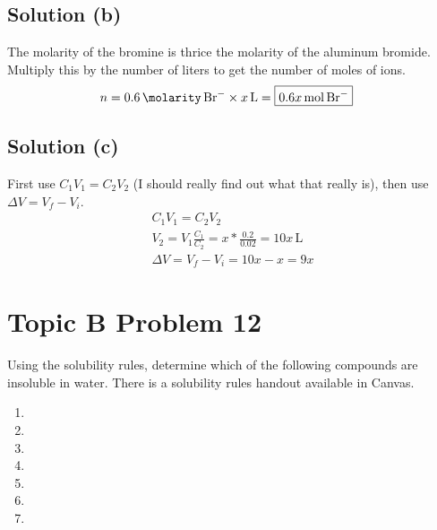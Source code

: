 \documentclass[10pt]{article}
\begin{document}
        \subsection{Solution (b)}
            The molarity of the bromine is thrice the molarity of the aluminum bromide.
            Multiply this by the number of liters to get the number of moles of ions.
            \begin{align}
                n   &=  0.6\,\unit{\molarity}\,\ce{Br-} \times x\,\unit{\liter}
                    =   \boxed{0.6x\,\unit{\mole}\,\ce{Br-}}
            \end{align}
        
        \subsection{Solution (c)}
            First use $C_1 V_1 = C_2 V_2$ (I should really find out what that really is), then use $\Delta V = V_f - V_i$.
            \begin{gather}
                C_1 V_1 = C_2 V_2\\
                V_2 =   V_1 \frac{C_1}{C_2}
                    =   x * \frac{0.2}{0.02}
                    =   10x\,\unit{\liter}\\
                \Delta V    =   V_f - V_i
                    =   10x - x
                    =   \boxed{9x}
            \end{gather}

    \pagebreak
    \section{Topic B Problem 12}
        Using the solubility rules, determine which of the following compounds are insoluble in water. 
        There is a solubility rules handout available in Canvas.
        \begin{multicols}{3}
            \begin{enumerate}[label=\alph*)]
                \item   {} 
                \item   {}
                \item   {}
                \item   {}
                \item   {}
                \item   {}
                \item   {}
            \end{enumerate}
        \end{multicols}
\end{document}
